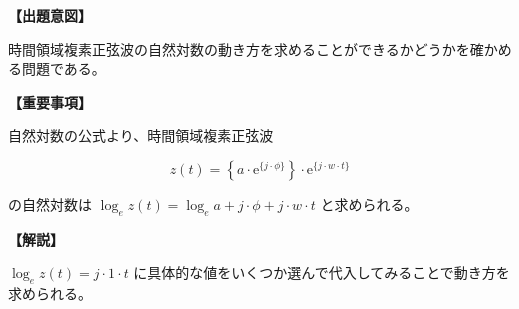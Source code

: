 \noindent \textbf{【出題意図】}

\bigskip
\noindent 時間領域複素正弦波の自然対数の動き方を求めることができるかどうかを確かめる問題である。

\vspace{1em}
\noindent \textbf{【重要事項】}

\medskip
\noindent 自然対数の公式より、時間領域複素正弦波 

\[
z(t) =  \left \{ a \cdot \textrm{e}^{\{j \cdot \phi\}} \right \} 
\cdot \textrm{e}^{\{j \cdot w \cdot t \}}
\]

\bigskip
\noindent の自然対数は $\log_e z(t) =  \log_e a + j \cdot \phi + j \cdot w \cdot t$ と求められる。

\bigskip

\vspace{1em}
\noindent \textbf{【解説】}

\bigskip
\noindent $\log_e z(t) =  j \cdot 1 \cdot t$ に具体的な値をいくつか選んで代入してみることで動き方を求められる。
